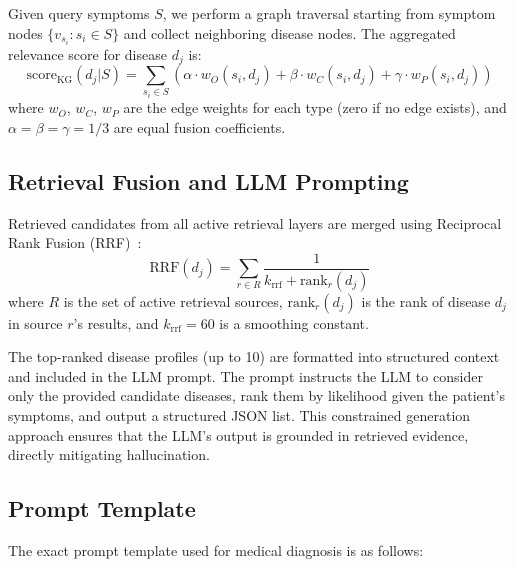\documentclass[preprint,12pt]{elsarticle}
\begin{document}
Given query symptoms $S$, we perform a graph traversal starting from symptom nodes $\{v_{s_i} : s_i \in S\}$ and collect neighboring disease nodes. The aggregated relevance score for disease $d_j$ is:
\begin{equation}
    \text{score}_{\text{KG}}(d_j | S) = \sum_{s_i \in S} \left(\alpha \cdot w_O(s_i, d_j) + \beta \cdot w_C(s_i, d_j) + \gamma \cdot w_P(s_i, d_j)\right)
\label{eq:kg_score}
\end{equation}
where $w_O$, $w_C$, $w_P$ are the edge weights for each type (zero if no edge exists), and $\alpha = \beta = \gamma = 1/3$ are equal fusion coefficients.

\subsection{Retrieval Fusion and LLM Prompting}
\label{sec:fusion}

Retrieved candidates from all active retrieval layers are merged using Reciprocal Rank Fusion (RRF)~\cite{cormack2009reciprocal}:
\begin{equation}
    \text{RRF}(d_j) = \sum_{r \in R} \frac{1}{k_{\text{rrf}} + \text{rank}_r(d_j)}
\end{equation}
where $R$ is the set of active retrieval sources, $\text{rank}_r(d_j)$ is the rank of disease $d_j$ in source $r$'s results, and $k_{\text{rrf}} = 60$ is a smoothing constant.

The top-ranked disease profiles (up to 10) are formatted into structured context and included in the LLM prompt. The prompt instructs the LLM to consider only the provided candidate diseases, rank them by likelihood given the patient's symptoms, and output a structured JSON list. This constrained generation approach ensures that the LLM's output is grounded in retrieved evidence, directly mitigating hallucination.

\subsection{Prompt Template}
\label{sec:prompt_template}

The exact prompt template used for medical diagnosis is as follows:
\end{document}
